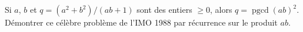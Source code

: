 Si $a$, $b$ et $q = (a^2 + b^2)/(ab + 1)$ sont des entiers $\geq 0$, alors $q = \operatorname{pgcd}(ab)^2$. Démontrer ce célèbre problème de l'IMO 1988 par récurrence sur le produit $ab$.
